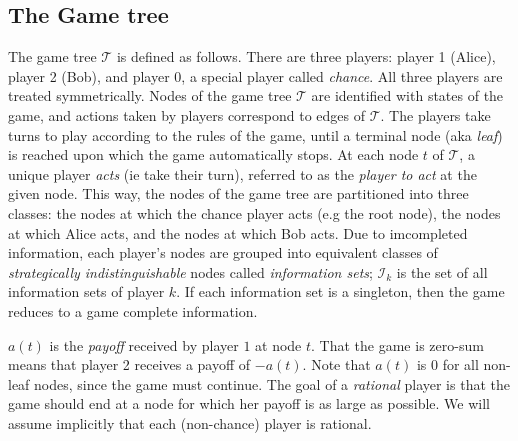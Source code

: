\documentclass{article} %
\begin{document}
\subsection{The Game tree}
The game tree $\mathcal{T}$ is defined as follows. There are three players: player 1 (Alice), player 2 (Bob), and player 0, a special player called \textit{chance}. All three players are treated symmetrically. Nodes of the game tree $\mathcal{T}$ are identified with states of the game, and actions taken by players correspond to edges of $\mathcal{T}$.
The players take turns to play according to the rules of the game, until a terminal node (aka \textit{leaf}) is reached upon which the game automatically stops. %
At each node $t$ of $\mathcal{T}$, a unique player \textit{acts} (ie take their turn), referred to as the \textit{player to act} at the given node. This way, the nodes of the game tree are partitioned into three classes: the nodes at which the chance player acts (e.g the root node), the nodes at which Alice acts, and the nodes at which Bob acts. Due to imcompleted information, each player's nodes are grouped into equivalent classes of \textit{strategically indistinguishable} nodes called \textit{information sets}; $\mathcal{I}_k$ is the set of all information sets of player $k$. If each information set is a singleton, then the game reduces to a game complete information.

$a(t)$ is the \textit{payoff} received by player $1$ at node $t$. That the game is zero-sum means that player 2
receives a payoff of $-a(t)$. Note that $a(t)$ is $0$ for all non-leaf nodes, since the game must continue.
The goal of a \textit{rational} player is that the game should end at a node for which her payoff is as large as possible.
We will assume implicitly that each (non-chance) player is rational.
\end{document}
